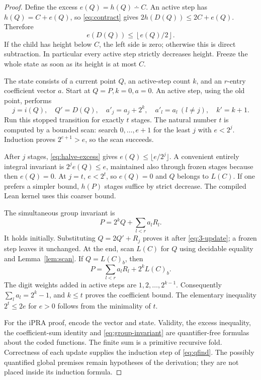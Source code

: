 \begin{proof}
Define the excess $e(Q)=h(Q)\dotminus C$. An active step has
$h(Q)=C+e(Q)$, so \eqref{eq:contract} gives
$2h(D(Q))\le2C+e(Q)$. Therefore
\[
 e(D(Q))\le \left\lfloor e(Q)/2\right\rfloor.
 \tag{3.3}\label{eq:halve-excess}
\]
If the child has height below $C$, the left side is zero; otherwise this
is direct subtraction. In particular every active step strictly decreases
height. Freeze the whole state as soon as its height is at most $C$.

The state consists of a current point $Q$, an active-step count $k$,
and an $r$-entry coefficient vector $a$. Start at
$Q=P,k=0,a=0$. An active step, using the old point, performs
\[
 j=i(Q),\quad Q'=D(Q),\quad
 a'_j=a_j+2^k,\quad a'_l=a_l\ (l\ne j),\quad k'=k+1.
 \tag{3.4}\label{eq:3-update}
\]
Run this stopped transition for exactly $t$ stages. The natural number $t$
is computed by a bounded scan: search $0,\ldots,e+1$ for the least $j$
with $e<2^j$. Induction proves $2^{e+1}>e$, so the scan succeeds.

After $j$ stages, \eqref{eq:halve-excess} gives
$e(Q)\le\lfloor e/2^j\rfloor$. A convenient entirely integral invariant
is $2^j e(Q)\le e$, maintained also through frozen stages because then
$e(Q)=0$. At $j=t$, $e<2^t$, so $e(Q)=0$ and $Q$ belongs to $L(C)$.
If one prefers a simpler bound, $h(P)$ stages suffice by strict decrease.
The compiled Lean kernel uses this coarser bound.

The simultaneous group invariant is
\[
 P=2^kQ+\sum_{l<r}a_lR_l.
 \tag{3.5}\label{eq:group-invariant}
\]
It holds initially. Substituting $Q=2Q'+R_j$ proves it after
\eqref{eq:3-update}; a frozen step leaves it unchanged.
At the end, scan $L(C)$ for $Q$ using decidable equality and
Lemma~\ref{lem:scan}. If $Q=L(C)_b$, then
\[
 P=\sum_{l<r}a_lR_l+2^kL(C)_b.
 \tag{3.6}\label{eq:1-coord}
\]
The digit weights added in active steps are $1,2,\ldots,2^{k-1}$.
Consequently $\sum_l a_l=2^k-1$, and $k\le t$ proves the coefficient
bound. The elementary inequality $2^t\le2e$ for $e>0$ follows from the
minimality of $t$.

For the iPRA proof, encode the vector and state. Validity, the excess
inequality, the coefficient-sum identity and
\eqref{eq:group-invariant} are quantifier-free formulas about the coded
functions. The finite sum is a primitive recursive fold. Correctness of
each update supplies the induction step of \eqref{eq:qfind}. The possibly
quantified global premises remain hypotheses of the derivation; they
are not placed inside its induction formula.
\end{proof}

